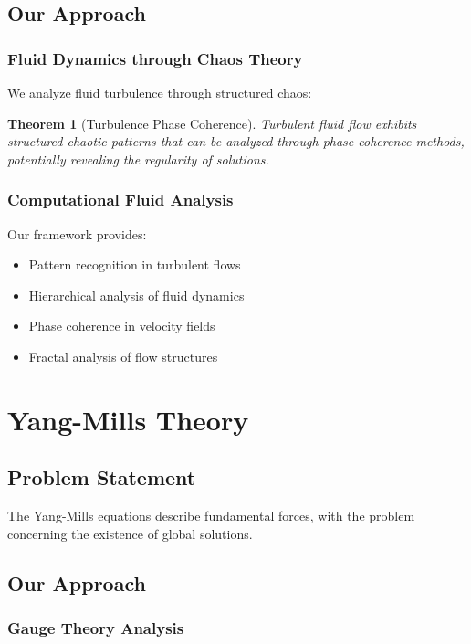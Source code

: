 \documentclass[12pt]{article}
\newtheorem{theorem}{Theorem}
\begin{document}
\subsection{Our Approach}

\subsubsection{Fluid Dynamics through Chaos Theory}

We analyze fluid turbulence through structured chaos:

\begin{theorem}[Turbulence Phase Coherence]
Turbulent fluid flow exhibits structured chaotic patterns that can be analyzed through phase coherence methods, potentially revealing the regularity of solutions.
\end{theorem}

\subsubsection{Computational Fluid Analysis}

Our framework provides:
\begin{itemize}
    \item Pattern recognition in turbulent flows
    \item Hierarchical analysis of fluid dynamics
    \item Phase coherence in velocity fields
    \item Fractal analysis of flow structures
\end{itemize}

\section{Yang-Mills Theory}

\subsection{Problem Statement}
The Yang-Mills equations describe fundamental forces, with the problem concerning the existence of global solutions.

\subsection{Our Approach}

\subsubsection{Gauge Theory Analysis}
\end{document}
